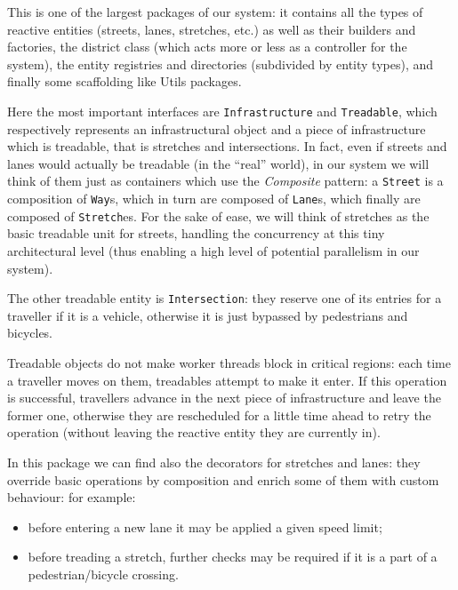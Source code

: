 This is one of the largest packages of our system: it contains all the types of
reactive entities (streets, lanes, stretches, etc.) as well as their builders
and factories, the district class (which acts more or less as a controller for
the system), the entity registries and directories (subdivided by entity types),
and finally some scaffolding like Utils packages.

Here the most important interfaces are \texttt{Infrastructure} and
\texttt{Treadable}, which respectively represents an infrastructural object and
a piece of infrastructure which is treadable, that is stretches and
intersections.
In fact, even if streets and lanes would actually be treadable (in the ``real''
world), in our system we will think of them just as containers which use the
\textit{Composite} pattern: a \texttt{Street} is a composition of \texttt{Way}s,
which in turn are composed of \texttt{Lane}s, which finally are composed of
\texttt{Stretch}es.
For the sake of ease, we will think of stretches as the basic treadable unit
for streets, handling the concurrency at this tiny architectural level (thus
enabling a high level of potential parallelism in our system).

The other treadable entity is \texttt{Intersection}: they reserve one of its
entries for a traveller if it is a vehicle, otherwise it is just bypassed by
pedestrians and bicycles.

Treadable objects do not make worker threads block in critical regions: each
time a traveller moves on them, treadables attempt to make it enter. If this
operation is successful, travellers advance in the next piece of infrastructure
and leave the former one, otherwise they are rescheduled for a little time ahead
to retry the operation (without leaving the reactive entity they are currently
in).

In this package we can find also the decorators for stretches and lanes: they
override basic operations by composition and enrich some of them with custom
behaviour: for example:
\begin{itemize}
  \item before entering a new lane it may be applied a given speed limit;
  \item before treading a stretch, further checks may be required if it is a
    part of a pedestrian/bicycle crossing.
 \end{itemize}
